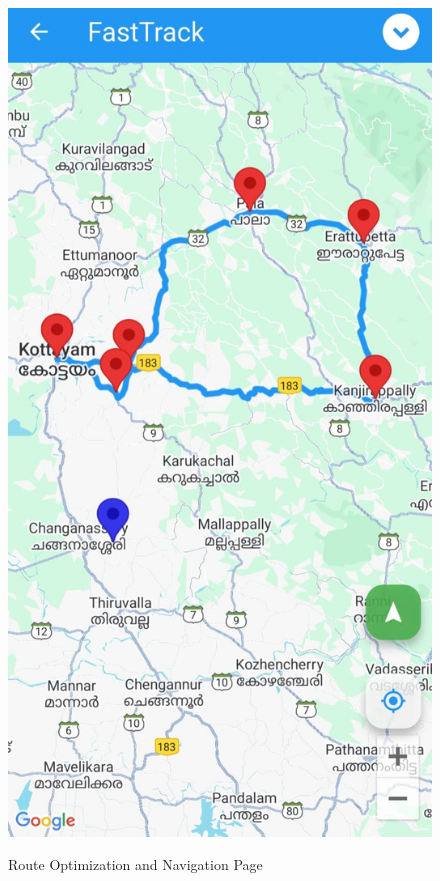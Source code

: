 \begin{figure}[H]
\begin{minipage}{0.24\textwidth}
    \label{fig:route_optimization26}
\end{minipage}%
\hspace{5mm}
\begin{minipage}{0.24\textwidth}
    \centering
    \includegraphics[width=\linewidth]{4/Route_Optimization1.jpg}
    \label{fig:route_optimization16}
\end{minipage}
\caption{Route Optimization and Navigation Page}
\label{fig:route_optimization_combined1}
\end{figure}
